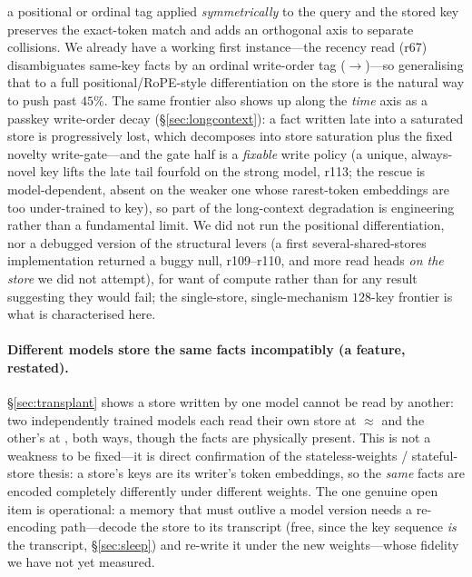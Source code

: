 a positional or ordinal tag applied \emph{symmetrically} to the query and the stored key
preserves the exact-token match and adds an orthogonal axis to separate collisions. We already
have a working first instance---the recency read (r67) disambiguates same-key facts by an ordinal
write-order tag ($\to$)---so generalising that to a full
positional/RoPE-style differentiation on the store is the natural way to push past $45\%$. The
same frontier also shows up along the \emph{time} axis as a passkey write-order decay
(\S\ref{sec:longcontext}): a fact written late into a saturated store is progressively lost,
which decomposes into store saturation plus the fixed novelty write-gate---and the gate half is
a \emph{fixable} write policy (a unique, always-novel key lifts the late tail fourfold on the
strong model, r113; the rescue is model-dependent, absent on the weaker one whose rarest-token
embeddings are too under-trained to key), so part of the long-context degradation is engineering
rather than a fundamental limit. We did
not run the positional differentiation, nor a debugged version of the structural levers (a first
several-shared-stores implementation returned a buggy null, r109--r110, and more read heads
\emph{on the store} we did not attempt), for want of compute rather than for any result
suggesting they would fail; the single-store, single-mechanism $128$-key frontier is what is
characterised here.

\paragraph{Different models store the same facts incompatibly (a feature, restated).}
\S\ref{sec:transplant} shows a store written by one model cannot be read by another: two
independently trained models each read their own store at $\approx$ and the
other's at , both ways, though the facts are physically present. This is not a
weakness to be fixed---it is direct confirmation of the stateless-weights / stateful-store
thesis: a store's keys are its writer's token embeddings, so the \emph{same} facts are
encoded completely differently under different weights. The one genuine open item is
operational: a memory that must outlive a model version needs a re-encoding path---decode
the store to its transcript (free, since the key sequence \emph{is} the transcript,
\S\ref{sec:sleep}) and re-write it under the new weights---whose fidelity we have not yet
measured.

